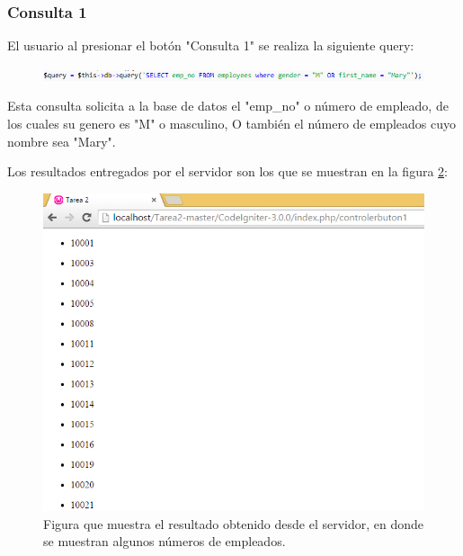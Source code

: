 \subsubsection{Consulta 1}

El usuario al presionar el botón "Consulta 1" se realiza la siguiente query:

\begin{figure}[htb]
	\label{Figura2}
	\begin{center}
		\includegraphics[scale=0.7]{imagenes/query1.png}
	\end{center}
\end{figure}

Esta consulta solicita a la base de datos el "emp\_no" o número de empleado, de los cuales su genero es "M" o masculino, O también el número de empleados cuyo nombre sea "Mary".

Los resultados entregados por el servidor son los que se muestran en la figura \ref{Figura3}:

\begin{figure}[htb]
	\label{Figura3}
	\begin{center}
		\includegraphics[scale=0.7]{imagenes/resultado1.png}
		\caption{Figura que muestra el resultado obtenido desde el servidor, en donde se muestran algunos números de empleados.}
	\end{center}
\end{figure}


